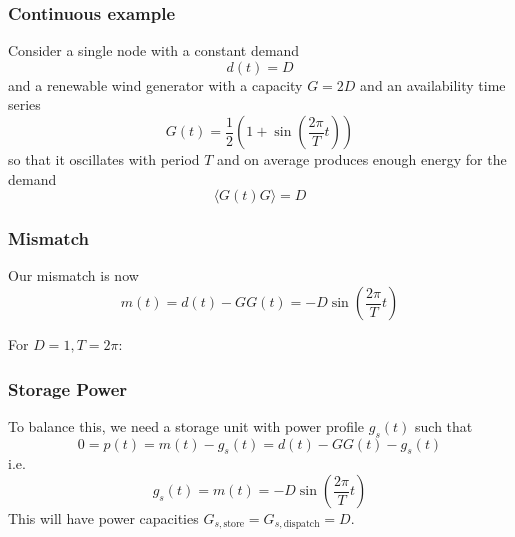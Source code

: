 \documentclass[10pt,aspectratio=169,dvipsnames]{beamer}
\begin{document}
\begin{frame}
  \frametitle{Continuous example}

  Consider a single node with a constant demand
  \begin{equation*}
    d(t) = D
  \end{equation*}
  and a renewable wind generator with a capacity $G = 2D$ and an
  availability time series
  \begin{equation*}
    G(t) = \frac{1}{2} \left(1 + \sin\left(\frac{2\pi}{T} t\right)\right)
  \end{equation*}
  so that it oscillates with period $T$ and on average produces enough energy for the demand
  \begin{equation*}
    \langle G(t) G \rangle = D
  \end{equation*}

\end{frame}

\begin{frame}
  \frametitle{Mismatch}

  Our mismatch is now
  \begin{equation*}
    m(t) = d(t) - G G(t) = -D\sin\left(\frac{2\pi}{T} t\right)
  \end{equation*}

  For $D =1, T = 2\pi$:


\end{frame}

\begin{frame}
  \frametitle{Storage Power}

  To balance this, we need a storage unit with power profile $g_s(t)$ such that
  \begin{equation*}
    0 = p(t) = m(t) - g_s(t) = d(t) - GG(t) - g_s(t)
  \end{equation*}
  i.e.
  \begin{equation*}
    g_s(t) = m(t) = -D\sin\left(\frac{2\pi}{T} t\right)
  \end{equation*}
  This will have power capacities $G_{s,\textrm{store}} = G_{s,\textrm{dispatch}} = D$.

\end{frame}
\end{document}
